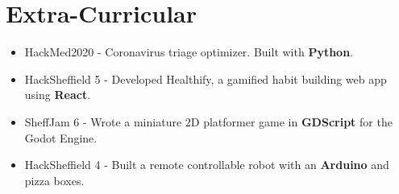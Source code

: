 \documentclass[11pt,a4paper,sans]{moderncv}
\begin{document}
\section{Extra-Curricular}

{\vspace{-1.0em}}{
\begin{itemize}
    \item HackMed2020 - Coronavirus triage optimizer. Built with \textbf{Python}.
    \item HackSheffield 5 - Developed Healthify, a gamified habit building web app using     \textbf{React}.
    \item SheffJam 6 - Wrote a miniature 2D platformer game in \textbf{GDScript} for the Godot Engine.
    \item HackSheffield 4 - Built a remote controllable robot with an \textbf{Arduino} and pizza boxes.
\end{itemize}}
\end{document}
